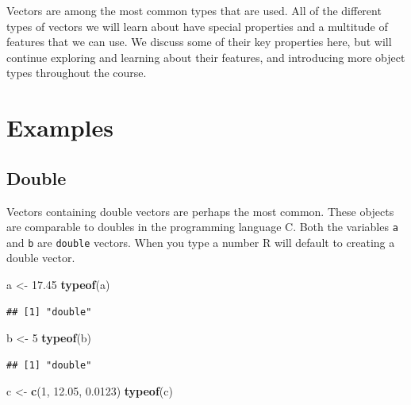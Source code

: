 \documentclass[
]{book}
\newenvironment{Shaded}{\begin{snugshade}}{\end{snugshade}}
\newcommand{\DecValTok}[1]{\textcolor[rgb]{0.00,0.00,0.81}{#1}}
\newcommand{\FloatTok}[1]{\textcolor[rgb]{0.00,0.00,0.81}{#1}}
\newcommand{\KeywordTok}[1]{\textcolor[rgb]{0.13,0.29,0.53}{\textbf{#1}}}
\newcommand{\NormalTok}[1]{#1}
\newcommand{\StringTok}[1]{\textcolor[rgb]{0.31,0.60,0.02}{#1}}
\begin{document}
Vectors are among the most common types that are used. All of the different types of vectors we will learn about have special properties and a multitude of features that we can use. We discuss some of their key properties here, but will continue exploring and learning about their features, and introducing more object types throughout the course.

\hypertarget{examples}{%
\section{Examples}\label{examples}}

\hypertarget{double}{%
\subsection*{Double}\label{double}}

Vectors containing double vectors are perhaps the most common. These objects are comparable to doubles in the programming language C. Both the variables \texttt{a} and \texttt{b} are \texttt{double} vectors. When you type a number R will default to creating a double vector.

\begin{Shaded}
\begin{Highlighting}[]
\NormalTok{a <-}\StringTok{ }\FloatTok{17.45}
\KeywordTok{typeof}\NormalTok{(a)}
\end{Highlighting}
\end{Shaded}

\begin{verbatim}
## [1] "double"
\end{verbatim}

\begin{Shaded}
\begin{Highlighting}[]
\NormalTok{b <-}\StringTok{ }\DecValTok{5}
\KeywordTok{typeof}\NormalTok{(b)}
\end{Highlighting}
\end{Shaded}

\begin{verbatim}
## [1] "double"
\end{verbatim}

\begin{Shaded}
\begin{Highlighting}[]
\NormalTok{c <-}\StringTok{ }\KeywordTok{c}\NormalTok{(}\DecValTok{1}\NormalTok{, }\FloatTok{12.05}\NormalTok{, }\FloatTok{0.0123}\NormalTok{)}
\KeywordTok{typeof}\NormalTok{(c)}
\end{Highlighting}
\end{Shaded}
\end{document}
